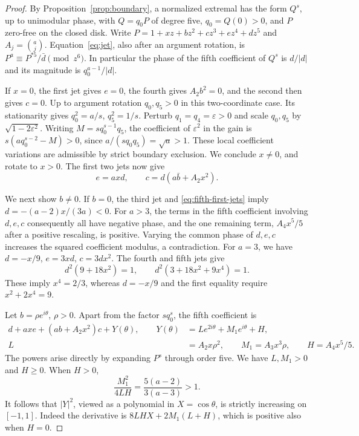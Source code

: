 \documentclass[11pt]{article}
\begin{document}
\begin{proof}
By Proposition~\ref{prop:boundary}, a normalized extremal has the
form \(Q^s\), up to unimodular phase, with \(Q=q_0P\) of degree five,
\(q_0=Q(0)>0\), and \(P\) zero-free on the closed disk. Write
\(P=1+xz+bz^2+cz^3+ez^4+dz^5\) and
\(A_j=\binom{a}{j}\). Equation~\eqref{eq:jet}, also after an
argument rotation, is
\(P^a\equiv P^{*5}/\bar d\pmod{z^6}\).
In particular the phase of the fifth coefficient of \(Q^s\) is
\(d/|d|\) and its magnitude is \(q_0^{a-1}/|d|\).

If \(x=0\), the first jet gives \(e=0\), the fourth gives
\(A_2b^2=0\), and the second then gives \(c=0\). Up to argument
rotation \(q_0,q_5>0\) in this two-coordinate case. Its stationarity
gives \(q_0^2=a/s\), \(q_5^2=1/s\).
Perturb \(q_1=q_4=\varepsilon>0\) and scale \(q_0,q_5\) by
\(\sqrt{1-2\varepsilon^2}\).
Writing \(M=sq_0^{s-1}q_5\), the coefficient of
\(\varepsilon^2\) in the gain is
\(s(aq_0^{s-2}-M)>0\), since
\(a/(s q_0 q_5)=\sqrt{a}>1\).
These local coefficient variations are admissible by strict
boundary exclusion. We conclude \(x\ne0\), and rotate to \(x>0\).
The first two jets now give
\begin{equation}\label{eq:fifth-first-jets}
 e=axd,\qquad c=d(a\bar b+A_2x^2).
\end{equation}

We next show \(b\ne0\). If \(b=0\), the third jet and
\eqref{eq:fifth-first-jets} imply \(d=-(a-2)x/(3a)<0\).
For \(a>3\), the terms in the fifth coefficient involving
\(d,e,c\) consequently all have negative phase, and the one
remaining term, \(A_4x^5/5\) after a positive rescaling, is positive.
Varying the common phase of \(d,e,c\) increases the squared
coefficient modulus, a contradiction.
For \(a=3\), we have \(d=-x/9\), \(e=3xd\), \(c=3dx^2\).
The fourth and fifth jets give
\[
 d^2(9+18x^2)=1,\qquad
 d^2(3+18x^2+9x^4)=1.
\]
These imply \(x^4=2/3\), whereas \(d=-x/9\) and the first
equality require \(x^2+2x^4=9\).

Let \(b=\rho e^{i\theta}\), \(\rho>0\). Apart from the factor
\(s q_0^s\), the fifth coefficient is
\begin{align*}
 d+a x e+(a b+A_2x^2)c+Y(\theta),\qquad
 Y(\theta)&=L e^{2i\theta}+M_1e^{i\theta}+H,\\
 L&=A_2x\rho^2,\qquad M_1=A_3x^3\rho,\qquad H=A_4x^5/5 .
\end{align*}
The powers arise directly by expanding \(P^s\) through order
five. We have \(L,M_1>0\) and \(H\geq0\). When \(H>0\),
\[
 \frac{M_1^2}{4LH}=\frac{5(a-2)}{3(a-3)}>1 .
\]
It follows that \(|Y|^2\), viewed as a polynomial in
\(X=\cos\theta\), is strictly increasing on \([-1,1]\).
Indeed the derivative is \(8LH X+2M_1(L+H)\), which is
positive also when \(H=0\).


\end{proof}
\end{document}
